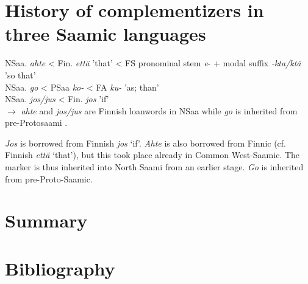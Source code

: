 \documentclass[a4,12pt]{scrartcl}
\begin{document}
\section{History of complementizers in three Saamic languages}\label{history}
NSaa. {\it ahte} < Fin. {\it että} 'that' < FS pronominal stem {\it *e}- + modal suffix {\it -kta/ktä} 'so that'\bigskip\\
NSaa. {\it go} < PSaa {\it *ko-} < FA {\it *ku-} 'as; than'\bigskip\\
NSaa. {\it jos/jus} < Fin. {\it jos} 'if'\bigskip\\
$\rightarrow$ {\it ahte} and {\it jos/jus} are Finnish loanwords in NSaa while {\it go} is inherited from pre-Protosaami \cite[226;245;251]{sammallahti1998b}.

 {\it Jos} is borrowed from Finnish {\it jos} ‘if’. {\it Ahte} is also borrowed from Finnic (cf. Finnish {\it että} ‘that’), but this took place already in Common West-Saamic. The marker is thus inherited into North Saami from an earlier stage. {\it Go} is inherited from pre-Proto-Saamic.
%


\section{Summary}


\section[Bibliography]{Bibliography}

 
\end{document}
